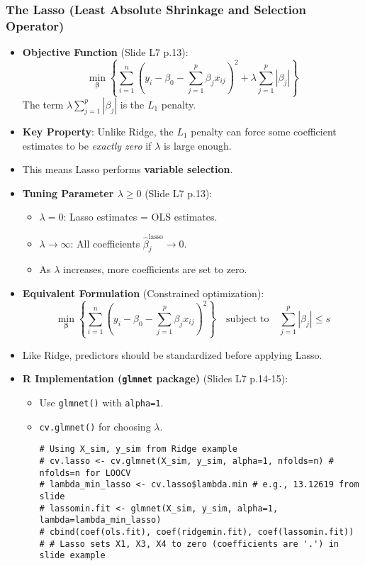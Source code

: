 \documentclass[12pt,a4paper]{article}
\newcommand{\Rpackage}[1]{\texttt{#1}} %
\newcommand{\Rfunction}[1]{\texttt{#1()}} %
\newcommand{\Rcode}[1]{\texttt{#1}} %
\begin{document}
\begin{itemize}
\begin{itemize}
    \subsubsection{The Lasso (Least Absolute Shrinkage and Selection Operator)}
        \begin{itemize}
            \item \textbf{Objective Function} (Slide L7 p.13):
                $$ \min_{\boldsymbol{\beta}} \left\{ \sum_{i=1}^{n} \left(y_i - \beta_0 - \sum_{j=1}^{p} \beta_j x_{ij}\right)^2 + \lambda \sum_{j=1}^{p} |\beta_j| \right\} $$
                The term $\lambda \sum_{j=1}^{p} |\beta_j|$ is the $L_1$ penalty.
            \item \textbf{Key Property}: Unlike Ridge, the $L_1$ penalty can force some coefficient estimates to be \textit{exactly zero} if $\lambda$ is large enough.
            \item This means Lasso performs \textbf{variable selection}.
            \item \textbf{Tuning Parameter $\lambda \ge 0$} (Slide L7 p.13):
                \begin{itemize}
                    \item $\lambda = 0$: Lasso estimates = OLS estimates.
                    \item $\lambda \to \infty$: All coefficients $\hat{\beta}_j^{\text{lasso}} \to 0$.
                    \item As $\lambda$ increases, more coefficients are set to zero.
                \end{itemize}
            \item \textbf{Equivalent Formulation} (Constrained optimization):
                $$ \min_{\boldsymbol{\beta}} \left\{ \sum_{i=1}^{n} \left(y_i - \beta_0 - \sum_{j=1}^{p} \beta_j x_{ij}\right)^2 \right\} \quad \text{subject to} \quad \sum_{j=1}^{p} |\beta_j| \le s $$
            \item Like Ridge, predictors should be standardized before applying Lasso.
            \item \textbf{R Implementation (\Rpackage{glmnet} package)} (Slides L7 p.14-15):
                \begin{itemize}
                    \item Use \Rfunction{glmnet} with \Rcode{alpha=1}.
                    \item \Rfunction{cv.glmnet} for choosing $\lambda$.
\begin{lstlisting}[caption={Lasso Example (Simulated Data, Slides L7 p.14-15)}]
# Using X_sim, y_sim from Ridge example
# cv.lasso <- cv.glmnet(X_sim, y_sim, alpha=1, nfolds=n) # nfolds=n for LOOCV
# lambda_min_lasso <- cv.lasso$lambda.min # e.g., 13.12619 from slide
# lassomin.fit <- glmnet(X_sim, y_sim, alpha=1, lambda=lambda_min_lasso)
# cbind(coef(ols.fit), coef(ridgemin.fit), coef(lassomin.fit))
# # Lasso sets X1, X3, X4 to zero (coefficients are '.') in slide example


\end{lstlisting}
\end{itemize}
\end{itemize}
\end{itemize}
\end{itemize}
\end{document}
